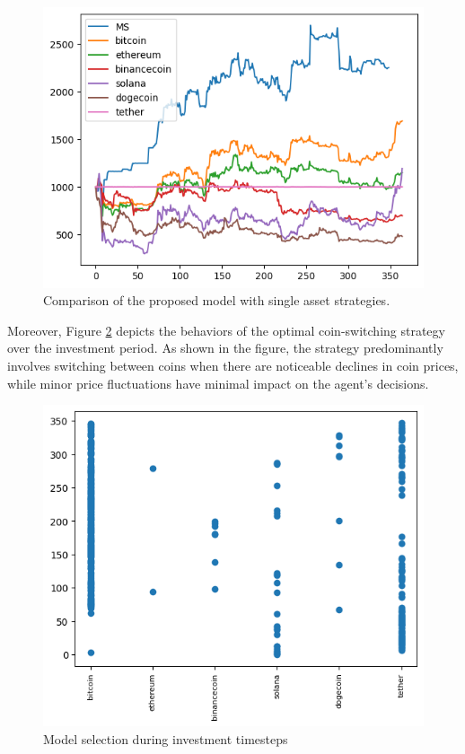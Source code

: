 \begin{figure}[h]
	\centering
	\includegraphics[scale=0.8]{./ms_with_tether.png}
	\caption{Comparison of the proposed model with single asset strategies.}
	\label{fig:versions}
\end{figure}

Moreover, Figure \ref{fig:changes1} depicts the behaviors of the optimal coin-switching strategy over the investment period. As shown in the figure, the strategy predominantly involves switching between coins when there are noticeable declines in coin prices, while minor price fluctuations have minimal impact on the agent's decisions.



\begin{figure}[h]
	\centering
	\includegraphics[scale=0.8]{./changes1.png}
	\caption{Model selection during investment timesteps}
	\label{fig:changes1}
\end{figure}

